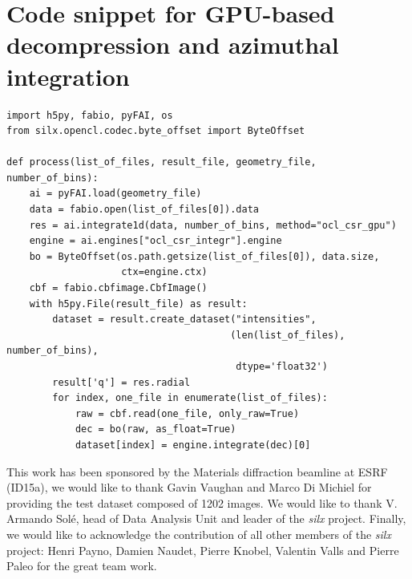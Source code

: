 \documentclass[preprint]{iucr}              %
\begin{document}
\goodbreak

\section{Code snippet for GPU-based decompression and azimuthal integration}

\begin{minipage}{\linewidth}
\label{parallelsnippet}
\begin{verbatim}
import h5py, fabio, pyFAI, os
from silx.opencl.codec.byte_offset import ByteOffset

def process(list_of_files, result_file, geometry_file, number_of_bins):
    ai = pyFAI.load(geometry_file)
    data = fabio.open(list_of_files[0]).data
    res = ai.integrate1d(data, number_of_bins, method="ocl_csr_gpu")
    engine = ai.engines["ocl_csr_integr"].engine
    bo = ByteOffset(os.path.getsize(list_of_files[0]), data.size,
                    ctx=engine.ctx) 
    cbf = fabio.cbfimage.CbfImage()
    with h5py.File(result_file) as result:
        dataset = result.create_dataset("intensities", 
                                       (len(list_of_files), number_of_bins),
                                        dtype='float32') 
        result['q'] = res.radial 
        for index, one_file in enumerate(list_of_files):
            raw = cbf.read(one_file, only_raw=True)
            dec = bo(raw, as_float=True)
            dataset[index] = engine.integrate(dec)[0]
\end{verbatim}
\end{minipage}

\goodbreak

This work has been sponsored by the Materials diffraction beamline at ESRF
(ID15a), we would like to thank Gavin Vaughan and Marco Di Michiel for
providing the test dataset composed of 1202 images.
We would like to thank V. Armando Solé, head of Data Analysis Unit and leader
of the \textit{silx} project. 
Finally, we would like to acknowledge the contribution of all other members
of the \textit{silx} project:
Henri Payno, Damien Naudet, Pierre Knobel, Valentin Valls and
Pierre Paleo for the great team work.



\end{document}
